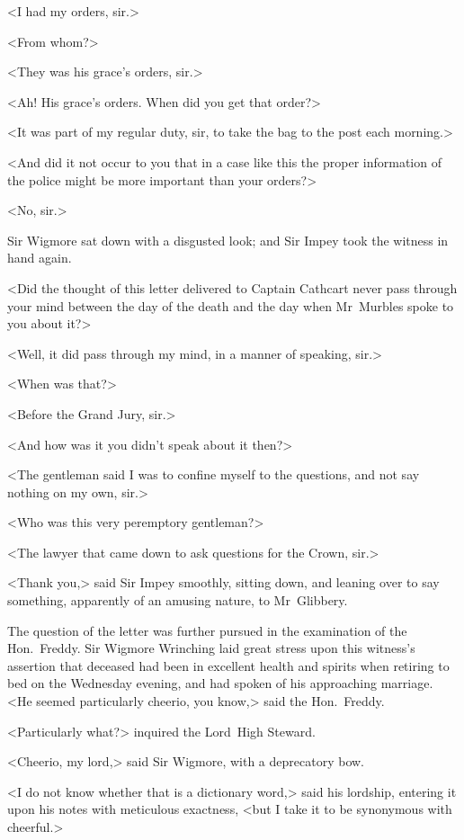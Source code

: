 <I had my orders, sir.>

<From whom?>

<They was his grace's orders, sir.>

<Ah! His grace's orders. When did you get that order?>

<It was part of my regular duty, sir, to take the bag to the post each morning.>

<And did it not occur to you that in a case like this the proper information of the police might be more important than your orders?>

<No, sir.>

Sir Wigmore sat down with a disgusted look; and Sir Impey took the witness in hand again.

<Did the thought of this letter delivered to Captain Cathcart never pass through your mind between the day of the death and the day when Mr~Murbles spoke to you about it?>

<Well, it did pass through my mind, in a manner of speaking, sir.>

<When was that?>

<Before the Grand Jury, sir.>

<And how was it you didn't speak about it then?>

<The gentleman said I was to confine myself to the questions, and not say nothing on my own, sir.>

<Who was this very peremptory gentleman?>

<The lawyer that came down to ask questions for the Crown, sir.>

<Thank you,> said Sir Impey smoothly, sitting down, and leaning over to say something, apparently of an amusing nature, to Mr~Glibbery.

The question of the letter was further pursued in the examination of the Hon.~Freddy. Sir Wigmore Wrinching laid great stress upon this witness's assertion that deceased had been in excellent health and spirits when retiring to bed on the Wednesday evening, and had spoken of his approaching marriage. <He seemed particularly cheerio, you know,> said the Hon.~Freddy.

<Particularly what?> inquired the Lord~High Steward.

<Cheerio, my lord,> said Sir Wigmore, with a deprecatory bow.

<I do not know whether that is a dictionary word,> said his lordship, entering it upon his notes with meticulous exactness, <but I take it to be synonymous with cheerful.>

